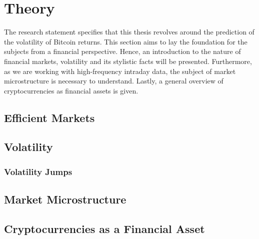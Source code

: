 \chapter{Theory}
\label{sec:orga7e1c8a}
The research statement specifies that this thesis revolves around the prediction of the volatility of Bitcoin returns.
This section aims to lay the foundation for the subjects from a financial perspective.
Hence, an introduction to the nature of financial markets, volatility and its stylistic facts will be presented.
Furthermore, as we are working with high-frequency intraday data, the subject of market microstructure is necessary to understand.
Lastly, a general overview of cryptocurrencies as financial assets is given.

\section{Efficient Markets}
\label{sec:org1e911ea}


\section{Volatility}
\label{sec:org9e3d3c1}

\subsection{Volatility Jumps}
\label{sec:org349ks10}

\section{Market Microstructure}
\label{sec:org5e3d3c1}

\section{Cryptocurrencies as a Financial Asset}
\label{sec:org93ka01j}
